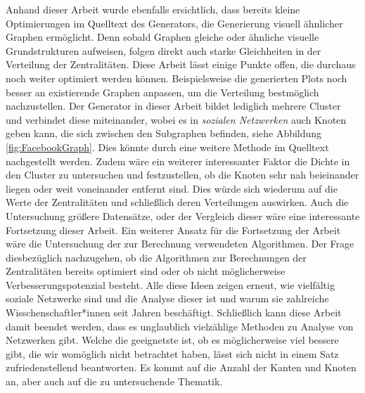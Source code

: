 Anhand dieser Arbeit wurde ebenfalls ersichtlich, dass bereits kleine Optimierungen im Quelltext des Generators, die Generierung visuell ähnlicher Graphen ermöglicht. Denn sobald Graphen gleiche oder ähnliche visuelle Grundstrukturen aufweisen, folgen direkt auch starke Gleichheiten in der Verteilung der Zentralitäten. Diese Arbeit lässt einige Punkte offen, die durchaus noch weiter optimiert werden können. Beispielsweise die generierten Plots noch besser an existierende Graphen anpassen, um die Verteilung bestmöglich nachzustellen. 
Der Generator in dieser Arbeit bildet lediglich mehrere Cluster und verbindet diese miteinander, wobei es in \textit{sozialen Netzwerken} auch Knoten geben kann, die sich zwischen den Subgraphen befinden, siehe Abbildung \ref{fig:FacebookGraph}. Dies könnte durch eine weitere Methode im Quelltext nachgestellt werden. Zudem wäre ein weiterer interessanter Faktor die Dichte in den Cluster zu untersuchen und festzustellen, ob die Knoten sehr nah beieinander liegen oder weit voneinander entfernt sind. Dies würde sich wiederum auf die Werte der Zentralitäten und schließlich deren Verteilungen auswirken.
Auch die Untersuchung größere Datensätze, oder der Vergleich dieser wäre eine interessante Fortsetzung dieser Arbeit. Ein weiterer Ansatz für die Fortsetzung der Arbeit wäre die Untersuchung der zur Berechnung verwendeten Algorithmen. Der Frage diesbezüglich nachzugehen, ob die Algorithmen zur Berechnungen der Zentralitäten bereits optimiert sind oder ob nicht möglicherweise Verbesserungspotenzial besteht.  
Alle diese Ideen zeigen erneut, wie vielfältig soziale Netzwerke sind und die Analyse dieser ist und warum sie zahlreiche Wisschenschaftler*innen seit Jahren beschäftigt. Schließlich kann diese Arbeit damit beendet werden, dass es unglaublich vielzählige Methoden zu Analyse von Netzwerken gibt. Welche die geeignetste ist, ob es möglicherweise viel bessere gibt, die wir womöglich nicht betrachtet haben, lässt sich nicht in einem Satz zufriedenstellend beantworten. Es kommt auf die Anzahl der Kanten und Knoten an, aber auch auf die zu untersuchende Thematik.
